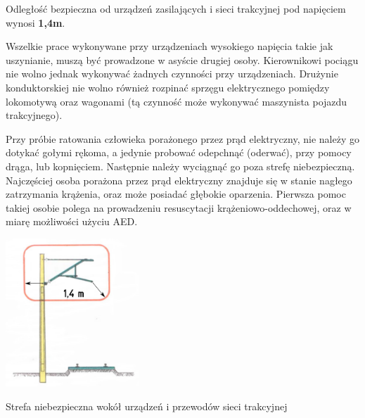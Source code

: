 Odległość bezpieczna od urządzeń zasilających i sieci trakcyjnej pod napięciem wynosi \textbf{1,4m}.

Wszelkie prace wykonywane przy urządzeniach wysokiego napięcia takie jak uszynianie, muszą być prowadzone w asyście drugiej osoby. Kierownikowi pociągu nie wolno jednak wykonywać żadnych czynności przy urządzeniach. Drużynie konduktorskiej nie wolno również rozpinać sprzęgu elektrycznego pomiędzy lokomotywą oraz wagonami (tą czynność może wykonywać maszynista pojazdu trakcyjnego).

Przy próbie ratowania człowieka porażonego przez prąd elektryczny, nie należy go dotykać gołymi rękoma, a jedynie probować odepchnąć (oderwać), przy pomocy drąga, lub kopnięciem. Następnie należy wyciągnąć go poza strefę niebezpieczną. Najczęściej osoba porażona przez prąd elektryczny znajduje się w stanie nagłego zatrzymania krążenia, oraz może posiadać głębokie oparzenia. Pierwsza pomoc takiej osobie polega na prowadzeniu resuscytacji krążeniowo-oddechowej, oraz w miarę możliwości użyciu AED.

\begin{marginfigure}
	\includegraphics[width=5cm]{skryptkierownik-img/strefa-niebezpieczna-trakcja-14.png}
	\caption{Strefa niebezpieczna wokół urządzeń i przewodów sieci trakcyjnej}
	\label{fig:strefa}
\end{marginfigure}




